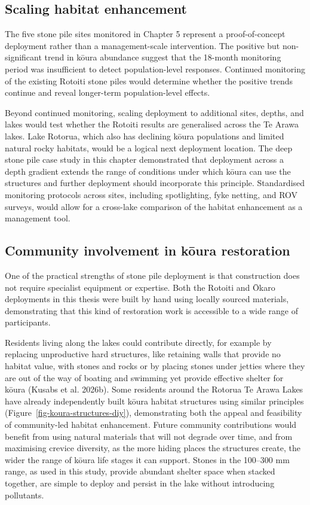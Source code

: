 \documentclass[
  12pt,
  a4paper,
  oneside]{scrbook}
\begin{document}
\subsection{Scaling habitat
enhancement}\label{scaling-habitat-enhancement}

The five stone pile sites monitored in Chapter 5 represent a
proof-of-concept deployment rather than a management-scale intervention.
The positive but non-significant trend in kōura abundance suggest that
the 18-month monitoring period was insufficient to detect
population-level responses. Continued monitoring of the existing Rotoiti
stone piles would determine whether the positive trends continue and
reveal longer-term population-level effects.

Beyond continued monitoring, scaling deployment to additional sites,
depths, and lakes would test whether the Rotoiti results are generalised
across the Te Arawa lakes. Lake Rotorua, which also has declining kōura
populations and limited natural rocky habitats, would be a logical next
deployment location. The deep stone pile case study in this chapter
demonstrated that deployment across a depth gradient extends the range
of conditions under which kōura can use the structures and further
deployment should incorporate this principle. Standardised monitoring
protocols across sites, including spotlighting, fyke netting, and ROV
surveys, would allow for a cross-lake comparison of the habitat
enhancement as a management tool.

\subsection{Community involvement in kōura
restoration}\label{community-involvement-in-kux14dura-restoration}

One of the practical strengths of stone pile deployment is that
construction does not require specialist equipment or expertise. Both
the Rotoiti and Ōkaro deployments in this thesis were built by hand
using locally sourced materials, demonstrating that this kind of
restoration work is accessible to a wide range of participants.

Residents living along the lakes could contribute directly, for example
by replacing unproductive hard structures, like retaining walls that
provide no habitat value, with stones and rocks or by placing stones
under jetties where they are out of the way of boating and swimming yet
provide effective shelter for kōura (Kusabs et al. 2026b). Some
residents around the Rotorua Te Arawa Lakes have already independently
built kōura habitat structures using similar principles
(Figure~\ref{fig-koura-structures-diy}), demonstrating both the appeal
and feasibility of community-led habitat enhancement. Future community
contributions would benefit from using natural materials that will not
degrade over time, and from maximising crevice diversity, as the more
hiding places the structures create, the wider the range of kōura life
stages it can support. Stones in the 100--300 mm range, as used in this
study, provide abundant shelter space when stacked together, are simple
to deploy and persist in the lake without introducing pollutants.
\end{document}
